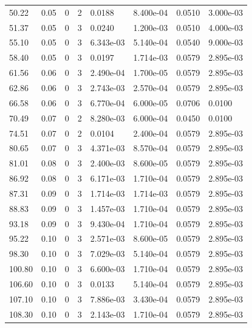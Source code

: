 \documentclass[preview]{standalone}
\begin{document}
{{\begin{tabular}{L{1.2cm}C{1.2cm} C{0.3cm}C{0.5cm} C{1.4cm}C{1.4cm} C{1.4cm}C{1.4cm}}
  50.22  &  0.05  & 0     &  2 &  0.0188  & 8.400e-04  & 0.0510 &  3.000e-03   \\ 
  51.37  &  0.05  & 0     &  3 &  0.0240  & 1.200e-03  & 0.0510 &  4.000e-03   \\ 
  55.10  &  0.05  & 0     &  3 &  6.343e-03  & 5.140e-04  & 0.0540 &  9.000e-03   \\ 
  58.40  &  0.05  & 0     &  3 &  0.0197  & 1.714e-03  & 0.0579 &  2.895e-03   \\ 
  61.56  &  0.06  & 0     &  3 &  2.490e-04  & 1.700e-05  & 0.0579 &  2.895e-03   \\ 
  62.86  &  0.06  & 0     &  3 &  2.743e-03  & 2.570e-04  & 0.0579 &  2.895e-03   \\ 
  66.58  &  0.06  & 0     &  3 &  6.770e-04  & 6.000e-05  & 0.0706 &  0.0100   \\ 
  70.49  &  0.07  & 0     &  2 &  8.280e-03  & 6.000e-04  & 0.0450 &  0.0100   \\ 
  74.51  &  0.07  & 0     &  2 &  0.0104  & 2.400e-04  & 0.0579 &  2.895e-03   \\ 
  80.65  &  0.07  & 0     &  3 &  4.371e-03  & 8.570e-04  & 0.0579 &  2.895e-03   \\ 
  81.01  &  0.08  & 0     &  3 &  2.400e-03  & 8.600e-05  & 0.0579 &  2.895e-03   \\ 
  86.92  &  0.08  & 0     &  3 &  6.171e-03  & 1.710e-04  & 0.0579 &  2.895e-03   \\ 
  87.31  &  0.09  & 0     &  3 &  1.714e-03  & 1.714e-03  & 0.0579 &  2.895e-03   \\ 
  88.83  &  0.09  & 0     &  3 &  1.457e-03  & 1.710e-04  & 0.0579 &  2.895e-03   \\ 
  93.18  &  0.09  & 0     &  3 &  9.430e-04  & 1.710e-04  & 0.0579 &  2.895e-03   \\ 
  95.22  &  0.10  & 0     &  3 &  2.571e-03  & 8.600e-05  & 0.0579 &  2.895e-03   \\ 
  98.30  &  0.10  & 0     &  3 &  7.029e-03  & 5.140e-04  & 0.0579 &  2.895e-03   \\ 
  100.80  &  0.10  & 0     &  3 &  6.600e-03  & 1.710e-04  & 0.0579 &  2.895e-03   \\ 
  106.60  &  0.10  & 0     &  3 &  0.0133  & 5.140e-04  & 0.0579 &  2.895e-03   \\ 
  107.10  &  0.10  & 0     &  3 &  7.886e-03  & 3.430e-04  & 0.0579 &  2.895e-03   \\ 
  108.30  &  0.10  & 0     &  3 &  2.143e-03  & 1.710e-04  & 0.0579 &  2.895e-03   \\ 

\end{tabular}}}
\end{document}
